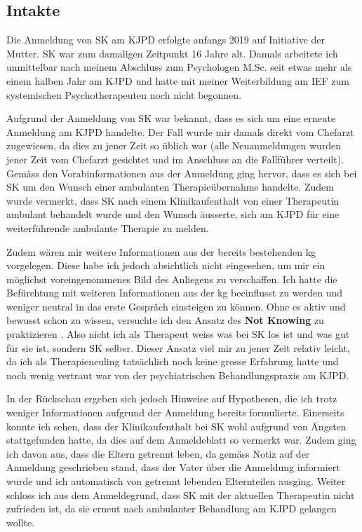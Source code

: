 \subsection{Intakte} 
Die Anmeldung von SK am KJPD erfolgte anfangs 2019 auf Initiative der Mutter. SK war zum damaligen Zeitpunkt 16 Jahre alt. Damals arbeitete ich unmittelbar nach meinem Abschluss zum Psychologen M.Sc. seit etwas mehr als einem halben Jahr am KJPD und hatte mit meiner Weiterbildung am IEF zum systemischen Psychotherapeuten noch nicht begonnen. 

Aufgrund der Anmeldung von SK war bekannt, dass es sich um eine erneute Anmeldung am KJPD handelte. Der Fall wurde mir damals direkt vom Chefarzt zugewiesen, da dies zu jener Zeit so üblich war (alle Neuanmeldungen wurden jener Zeit vom Chefarzt gesichtet und im Anschluss an die Fallführer verteilt). Gemäss den Vorabinformationen aus der Anmeldung ging hervor, dass es sich bei SK um den Wunsch einer ambulanten Therapieübernahme handelte. Zudem wurde vermerkt, dass SK nach einem Klinikaufenthalt von einer Therapeutin ambulant behandelt wurde und den Wunsch äusserte, sich am KJPD für eine weiterführende ambulante Therapie zu melden.

Zudem wären mir weitere Informationen aus der bereits bestehenden \ac{kg} vorgelegen. Diese habe ich jedoch absichtlich nicht eingesehen, um mir ein möglichst voreingenommenes Bild des Anliegens zu verschaffen. Ich hatte die Befürchtung mit weiteren Informationen aus der \ac{kg} beeinflusst zu werden und weniger neutral in das erste Gespräch einsteigen zu können. Ohne es aktiv und bewusst schon zu wissen, versuchte ich den Ansatz des \textbf{Not Knowing} zu praktizieren \cite{Anderson1992}. Also nicht ich als Therapeut weiss was bei SK los ist und was gut für sie ist, sondern SK selber. Dieser Ansatz viel mir zu jener Zeit relativ leicht, da ich als Therapieneuling tatsächlich noch keine grosse Erfahrung hatte und noch wenig vertraut war von der psychiatrischen Behandlungspraxis am KJPD. 

In der Rückschau ergeben sich jedoch Hinweise auf Hypothesen, die ich trotz weniger Informationen aufgrund der Anmeldung bereits formulierte. Einerseits konnte ich sehen, dass der Klinikaufenthalt bei SK wohl aufgrund von Ängsten stattgefunden hatte, da dies auf dem Anmeldeblatt so vermerkt war. Zudem ging ich davon aus, dass die Eltern getrennt leben, da gemäss Notiz auf der Anmeldung geschrieben stand, dass der Vater über die Anmeldung informiert wurde und ich automatisch von getrennt lebenden Elternteilen ausging. Weiter schloss ich aus dem Anmeldegrund, dass SK mit der aktuellen Therapeutin nicht zufrieden ist, da sie erneut nach ambulanter Behandlung am KJPD gelangen wollte. 

